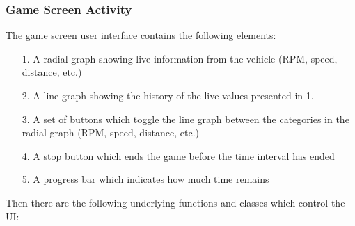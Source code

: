 \documentclass{article}
\begin{document}
\subsubsection{Game Screen Activity}
The game screen user interface contains the following elements:
\begin{itemize}
\item[1.] A radial graph showing live information from the vehicle (RPM, speed, distance, etc.)
\item[2.] A line graph showing the history of the live values presented in 1.
\item[3.] A set of buttons which toggle the line graph between the categories in the radial graph (RPM, speed, distance, etc.)
\item[4.] A stop button which ends the game before the time interval has ended
\item[5.] A progress bar which indicates how much time remains
\end{itemize}
Then there are the following underlying functions and classes which control the UI:
\end{document}

